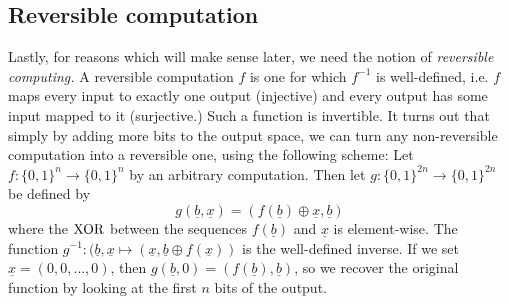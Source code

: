 \documentclass{article}
\newcommand{\XOR}{\ensuremath\text{XOR}}
\begin{document}
\subsection{Reversible computation}
Lastly, for reasons which will make sense later, we need the notion of \textit{reversible computing.} A reversible computation $f$ is one for which $f^{-1}$ is well-defined, i.e. $f$ maps every input to exactly one output (injective) and every output has some input mapped to it (surjective.) Such a function is invertible. It turns out that simply by adding more bits to the output space, we can turn any non-reversible computation into a reversible one, using the following scheme: Let $f:\{0,1\}^n \to \{0,1\}^n$ by an arbitrary computation. Then let $g:\{0,1\}^{2n} \to \{0,1\}^{2n}$ be defined by 
$$g(\underline b, \underline x) = (f(\underline b)\oplus \underline x, \underline b)
$$
where the $\XOR$ between the sequences $f(\underline b)$ and $\underline x$ is element-wise. The function $g^{-1}: (\underline b, \underline x \mapsto (\underline{x}, \underline{b} \oplus f(\underline{x}))$ is the well-defined inverse. If we set $\underline x = (0,0,\dots,0)$, then $g(\underline b, 0) = (f(\underline b), \underline b)$, so we recover the original function by looking at the first $n$ bits of the output.
\end{document}
